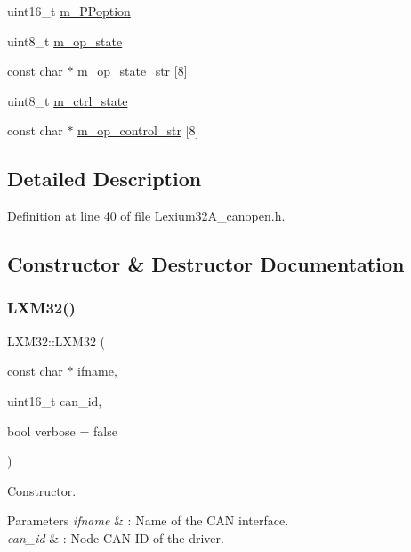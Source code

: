 \begin{DoxyCompactItemize}
\item 
uint16\+\_\+t \hyperlink{class_l_x_m32_a12354863abfb65d0997d45d90d23da96}{m\+\_\+\+P\+Poption}
\item 
uint8\+\_\+t \hyperlink{class_l_x_m32_af04b03864c14875f6f71818bfe3e159d}{m\+\_\+op\+\_\+state}
\item 
const char $\ast$ \hyperlink{class_l_x_m32_a484bfad62fafa8228dce4ad3cb7bde0c}{m\+\_\+op\+\_\+state\+\_\+str} \mbox{[}8\mbox{]}
\item 
uint8\+\_\+t \hyperlink{class_l_x_m32_a7f84595b6e2160211690301486cacde6}{m\+\_\+ctrl\+\_\+state}
\item 
const char $\ast$ \hyperlink{class_l_x_m32_a4659d2f6a3aca334e9ecc5cabd471c7c}{m\+\_\+op\+\_\+control\+\_\+str} \mbox{[}8\mbox{]}
\end{DoxyCompactItemize}


\subsection{Detailed Description}


Definition at line 40 of file Lexium32\+A\+\_\+canopen.\+h.



\subsection{Constructor \& Destructor Documentation}
\mbox{\label{class_l_x_m32_aa4a3e84b72c79b4d47e9f842a8977f98}} 
\subsubsection{\texorpdfstring{L\+X\+M32()}{LXM32()}}
{\footnotesize\ttfamily L\+X\+M32\+::\+L\+X\+M32 (\begin{DoxyParamCaption}\item[{const char $\ast$}]{ifname,  }\item[{uint16\+\_\+t}]{can\+\_\+id,  }\item[{bool}]{verbose = {\ttfamily false} }\end{DoxyParamCaption})}



Constructor. 


\begin{DoxyParams}{Parameters}
{\em ifname} & \+: Name of the C\+AN interface. \\
\hline
{\em can\+\_\+id} & \+: Node C\+AN ID of the driver. \\
\hline
\end{DoxyParams}


